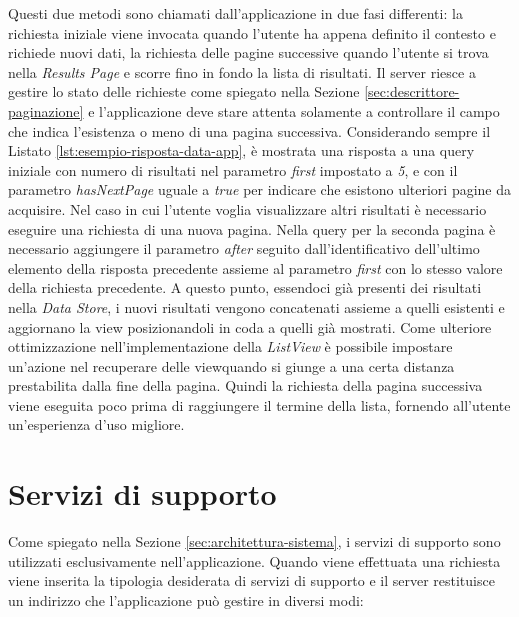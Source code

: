 Questi due metodi sono chiamati dall'applicazione in due fasi differenti: la richiesta iniziale viene invocata quando l'utente ha appena definito il contesto e richiede nuovi dati, la richiesta delle pagine successive quando l'utente si trova nella \emph{Results Page} e scorre fino in fondo la lista di risultati. 
Il server riesce a gestire lo stato delle richieste come spiegato nella Sezione \ref{sec:descrittore-paginazione} e l'applicazione deve stare attenta solamente a controllare il campo che indica l'esistenza o meno di una pagina successiva.
Considerando sempre il Listato \ref{lst:esempio-risposta-data-app}, è mostrata una risposta a una query iniziale con numero di risultati nel parametro \emph{first} impostato a \emph{5}, e con il parametro \emph{hasNextPage} uguale a \emph{true} per indicare che esistono ulteriori pagine da acquisire. Nel caso in cui l'utente voglia visualizzare altri risultati è necessario eseguire una richiesta di una nuova pagina. Nella query per la seconda pagina è necessario aggiungere il parametro \emph{after} seguito dall'identificativo dell'ultimo elemento della risposta precedente assieme al parametro \emph{first} con lo stesso valore della richiesta precedente. A questo punto, essendoci già presenti dei risultati nella \emph{Data Store}, i nuovi risultati vengono concatenati assieme a quelli esistenti e aggiornano la view posizionandoli in coda a quelli già mostrati. Come ulteriore ottimizzazione nell'implementazione della \emph{ListView} è possibile impostare un'azione nel recuperare delle viewquando si giunge a una certa distanza prestabilita dalla fine della pagina. Quindi la richiesta della pagina successiva viene eseguita poco prima di raggiungere il termine della lista, fornendo all'utente un'esperienza d'uso migliore.

\section{Servizi di supporto}\label{sec:servizi-supporto-app}

Come spiegato nella Sezione \ref{sec:architettura-sistema}, i servizi di supporto sono utilizzati esclusivamente nell'applicazione. Quando viene effettuata una richiesta viene inserita la tipologia desiderata di servizi di supporto e il server restituisce un indirizzo che l'applicazione può gestire in diversi modi:

